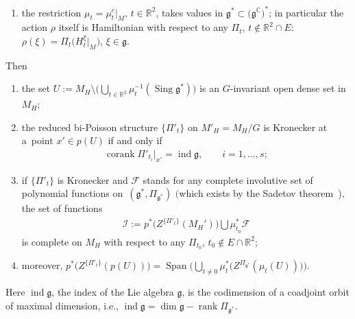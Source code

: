 \begin{Theorem}
\begin{enumerate}
 \item[$(e)$] the restriction $\mu_t=\mu^c_t|_M$, $t\in\mathbb{R}^2$, takes values in $\mathfrak{g}^* \subset \big(\mathfrak{g}^\mathbb{C}\big)^*$; in particular the action $\rho$ itself is Hamiltonian with respect to any $\Pi_t$, $t\not\in\mathbb{R}^2\cap E$: $\rho(\xi)=\Pi_t\big(H_t^\xi|_M\big)$, $\xi\in\mathfrak{g}$.
\end{enumerate}
Then
\begin{enumerate}\itemsep=0pt
\item[$1)$] the set $U:=M_H\setminus\big(\bigcup_{t\in\mathbb{R}^2}\mu_t^{-1}(\operatorname{Sing}\mathfrak{g}^*)\big)$ is an $G$-invariant open dense set in~$M_H$;
\item[$2)$] the reduced bi-Poisson structure $\{\Pi'_t\}$ on $M'_H=M_H/G$ is Kronecker at a~point $x'\in p(U)$ if and only if
\begin{gather*}
\operatorname{corank} \Pi'_{t_i}|_{x'}=\operatorname{ind} \mathfrak{g}, \qquad i=1,\dots,s;
\end{gather*}
\item[$3)$] if $\{\Pi'_t\}$ is Kronecker and $\mathcal{F}$ stands for any complete involutive set of polynomial functions on~$(\mathfrak{g}^*,\Pi_{\mathfrak{g}^*})$ $($which exists by the Sadetov theorem~{\rm \cite{sadetov})}, the set of functions
 \begin{gather}\label{setoffu}
 \mathcal{I}:= p^*\big(Z^{\{\Pi'_t\}}(M_H')\big)\bigcup \mu_{t_0}^*\mathcal{F}
 \end{gather}
is complete on $M_H$ with respect to any $\Pi_{t_0}$, $t_0\not\in E\cap\mathbb{R}^2$;
\item[$4)$] moreover, $p^*\big(Z^{\{\Pi'_t\}}(p(U))\big)=\operatorname{Span}\big(\bigcup_{t\not=0}\mu_t^*\big(Z^{\Pi_{\mathfrak{g}^*}}(\mu_t(U))\big)\big)$.
 \end{enumerate}
 Here $\operatorname{ind} \mathfrak{g}$, the index of the Lie algebra $\mathfrak{g}$, is the codimension of a coadjoint orbit of maximal dimension, i.e., $\operatorname{ind} \mathfrak{g}=\dim\mathfrak{g}-\operatorname{rank} \Pi_{\mathfrak{g}^*}$.
\end{Theorem}

